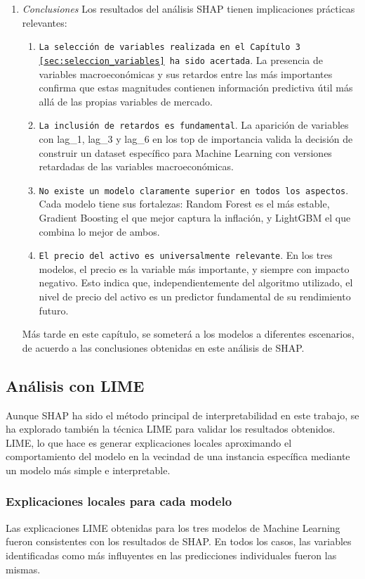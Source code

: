 \begin{enumerate}
\begin{enumerate}
        \item \emph{Conclusiones}
        Los resultados del análisis SHAP tienen implicaciones prácticas relevantes:

        \begin{enumerate}
            \item \texttt{La selección de variables realizada en el Capítulo 3 \ref{sec:seleccion_variables} ha sido acertada}. La presencia de variables macroeconómicas y sus retardos entre las más importantes confirma que estas magnitudes contienen información predictiva útil más allá de las propias variables de mercado.
            \item \texttt{La inclusión de retardos es fundamental}. La aparición de variables con lag\_1, lag\_3 y lag\_6 en los top de importancia valida la decisión de construir un dataset específico para Machine Learning con versiones retardadas de las variables macroeconómicas.
            \item \texttt{No existe un modelo claramente superior en todos los aspectos}. Cada modelo tiene sus fortalezas: Random Forest es el más estable, Gradient Boosting el que mejor captura la inflación, y LightGBM el que combina lo mejor de ambos.
            \item \texttt{El precio del activo es universalmente relevante}. En los tres modelos, el precio es la variable más importante, y siempre con impacto negativo. Esto indica que, independientemente del algoritmo utilizado, el nivel de precio del activo es un predictor fundamental de su rendimiento futuro.
        \end{enumerate}

        Más tarde en este capítulo, se someterá a los modelos a diferentes escenarios, de acuerdo a las conclusiones obtenidas en este análisis de SHAP.
    \end{enumerate}
\end{enumerate}


\subsection{Análisis con LIME}
Aunque SHAP ha sido el método principal de interpretabilidad en este trabajo, se ha explorado también la técnica LIME para validar los resultados obtenidos. LIME, lo que hace es generar explicaciones locales aproximando el comportamiento del modelo en la vecindad de una instancia específica mediante un modelo más simple e interpretable.

\subsubsection{Explicaciones locales para cada modelo}
Las explicaciones LIME obtenidas para los tres modelos de Machine Learning fueron consistentes con los resultados de SHAP. En todos los casos, las variables identificadas como más influyentes en las predicciones individuales fueron las mismas.

